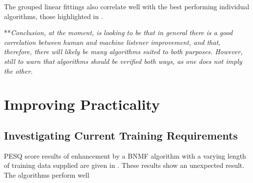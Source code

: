 The grouped linear fittings also correlate well with the best performing
individual algorithms, those highlighted in .

{*}{*}\textit{Conclusion, at the moment, is looking to be that in
general there is a good correlation between human and machine listener
improvement, and that, therefore, there will likely be many algorithms
suited to both purposes. However, still to warn that algorithms should
be verified both ways, as one does not imply the other.}


\section{Improving Practicality}


\subsection{Investigating Current Training Requirements}

\ac{PESQ} score results of enhancement by a \ac{BNMF} algorithm
with a varying length of training data supplied are given in .
These results show an unexpected result. The algorithms perform well %

